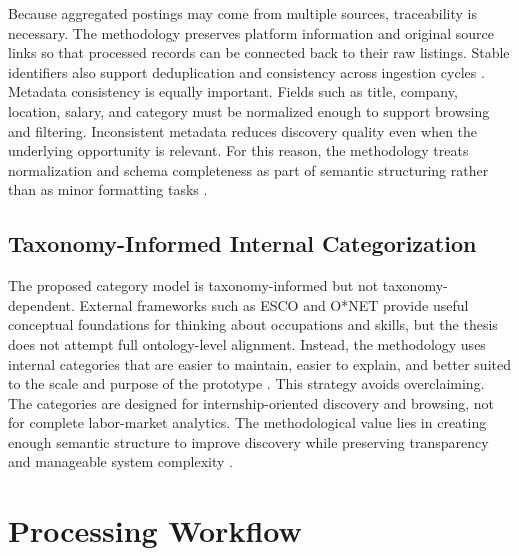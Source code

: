Because aggregated postings may come from multiple sources, traceability is necessary. The methodology
preserves platform information and original source links so that processed records can be connected back to
their raw listings. Stable identifiers also support deduplication and consistency across ingestion cycles \cite{christen2012data, elmagarmid2007duplicate}.
Metadata consistency is equally important. Fields such as title, company, location, salary, and category must be
normalized enough to support browsing and filtering. Inconsistent metadata reduces discovery quality even
when the underlying opportunity is relevant. For this reason, the methodology treats normalization and schema
completeness as part of semantic structuring rather than as minor formatting tasks \cite{batini2009methodologies, doan2012principles}.

\subsection{Taxonomy-Informed Internal Categorization}

The proposed category model is taxonomy-informed but not taxonomy-dependent. External frameworks such as
ESCO and O*NET provide useful conceptual foundations for thinking about occupations and skills, but the
thesis does not attempt full ontology-level alignment. Instead, the methodology uses internal categories that are
easier to maintain, easier to explain, and better suited to the scale and purpose of the prototype \cite{esco2024, peterson2001occupational, staab2009handbook}.
This strategy avoids overclaiming. The categories are designed for internship-oriented discovery and browsing,
not for complete labor-market analytics. The methodological value lies in creating enough semantic structure to
improve discovery while preserving transparency and manageable system complexity \cite{shvaiko2013ontology}.

\section{Processing Workflow}


